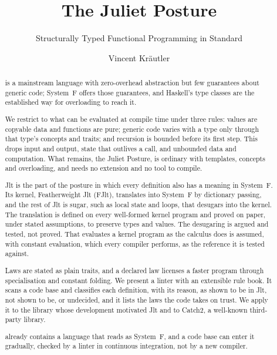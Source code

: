 \documentclass[english,submission]{programming}
\title{The Juliet Posture}
\subtitle{Structurally Typed Functional Programming in Standard \Cpp{23}}
\author{Vincent Kräutler}[https://orcid.org/0009-0006-7317-3502]
\affiliation{Unaffiliated}
\begin{document}
\maketitle

\begin{abstract}
%
%
\Cpp{} is a mainstream language with zero-overhead abstraction but few guarantees about generic code; System~F offers those guarantees, and Haskell's type classes are the established way for overloading to reach it.

We restrict  to what can be evaluated at compile time under three rules: values are copyable data and functions are pure; generic code varies with a type only through that type's concepts and traits; and recursion is bounded before its first step.
This drops input and output, state that outlives a call, and unbounded data and computation.
What remains, the Juliet Posture, is ordinary  with templates, concepts and overloading, and needs no extension and no tool to compile.

Jlt is the part of the posture in which every definition also has a meaning in System~F.
Its kernel, Featherweight Jlt (FJlt), translates into System~F by dictionary passing, and the rest of Jlt is sugar, such as local state and loops, that desugars into the kernel.
The translation is defined on every well-formed kernel program and proved on paper, under stated assumptions, to preserve types and values.
The desugaring is argued and tested, not proved.
That \Cpp{} evaluates a kernel program as the calculus does is assumed, with constant evaluation, which every compiler performs, as the reference it is tested against.

Laws are stated as plain \Cpp{} traits, and a declared law licenses a faster program through specialisation and constant folding.
We present a linter with an extensible rule book.
It scans a \Cpp{} code base and classifies each definition, with its reason, as shown to be in Jlt, not shown to be, or undecided, and it lists the laws the code takes on trust.
We apply it to the library whose development motivated Jlt and to Catch2, a well-known third-party library.

 already contains a language that reads as System~F, and a code base can enter it gradually, checked by a linter in continuous integration, not by a new compiler.
\end{abstract}
\end{document}

